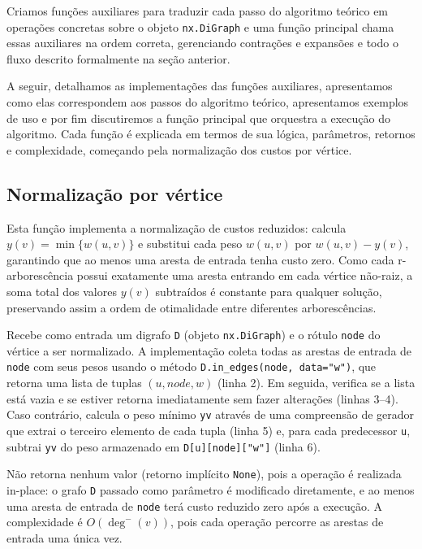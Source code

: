Criamos funções auxiliares para traduzir cada passo do algoritmo teórico em operações concretas sobre o objeto \texttt{nx.DiGraph} e uma função principal chama essas auxiliares na ordem correta, gerenciando contrações e expansões e todo o fluxo descrito formalmente na seção anterior.

A seguir, detalhamos as implementações das funções auxiliares, apresentamos como elas correspondem aos passos do algoritmo teórico, apresentamos exemplos de uso e por fim discutiremos a função principal que orquestra a execução do algoritmo. Cada função é explicada em termos de sua lógica, parâmetros, retornos e complexidade, começando pela normalização dos custos por vértice.

\subsection{Normalização por vértice}

Esta função implementa a normalização de custos reduzidos: calcula \(y(v)=\min\{w(u,v)\}\) e substitui cada peso \(w(u,v)\) por \(w(u,v)-y(v)\), garantindo que ao menos uma aresta de entrada tenha custo zero. Como cada r-arborescência possui exatamente uma aresta entrando em cada vértice não-raiz, a soma total dos valores \(y(v)\) subtraídos é constante para qualquer solução, preservando assim a ordem de otimalidade entre diferentes arborescências.

Recebe como entrada um digrafo \texttt{D} (objeto \texttt{nx.DiGraph}) e o rótulo \texttt{node} do vértice a ser normalizado. A implementação coleta todas as arestas de entrada de \texttt{node} com seus pesos usando o método \texttt{D.in\_edges(node, data="w")}, que retorna uma lista de tuplas \((u, node, w)\) (linha 2). Em seguida, verifica se a lista está vazia e se estiver retorna imediatamente sem fazer alterações (linhas 3--4). Caso contrário, calcula o peso mínimo \texttt{yv} através de uma compreensão de gerador que extrai o terceiro elemento de cada tupla (linha 5) e, para cada predecessor \texttt{u}, subtrai \texttt{yv} do peso armazenado em \texttt{D[u][node]["w"]} (linha 6).

Não retorna nenhum valor (retorno implícito \texttt{None}), pois a operação é realizada in-place: o grafo \texttt{D} passado como parâmetro é modificado diretamente, e ao menos uma aresta de entrada de \texttt{node} terá custo reduzido zero após a execução. A complexidade é \(O(\deg^-(v))\), pois cada operação percorre as arestas de entrada uma única vez.

